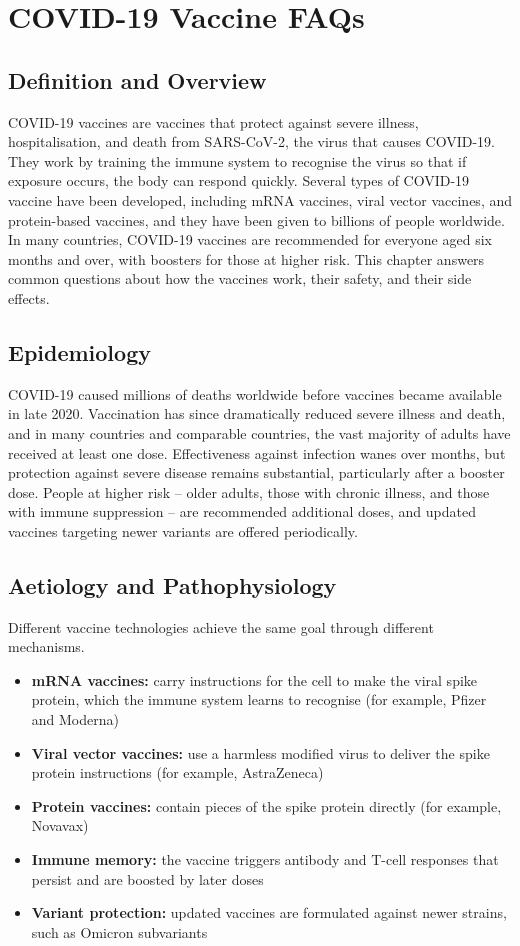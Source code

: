 \chapter{COVID-19 Vaccine FAQs}

\section*{Definition and Overview}
COVID-19 vaccines are vaccines that protect against severe illness, hospitalisation, and death from SARS-CoV-2, the virus that causes COVID-19. They work by training the immune system to recognise the virus so that if exposure occurs, the body can respond quickly. Several types of COVID-19 vaccine have been developed, including mRNA vaccines, viral vector vaccines, and protein-based vaccines, and they have been given to billions of people worldwide. In many countries, COVID-19 vaccines are recommended for everyone aged six months and over, with boosters for those at higher risk. This chapter answers common questions about how the vaccines work, their safety, and their side effects.

\section*{Epidemiology}
COVID-19 caused millions of deaths worldwide before vaccines became available in late 2020. Vaccination has since dramatically reduced severe illness and death, and in many countries and comparable countries, the vast majority of adults have received at least one dose. Effectiveness against infection wanes over months, but protection against severe disease remains substantial, particularly after a booster dose. People at higher risk -- older adults, those with chronic illness, and those with immune suppression -- are recommended additional doses, and updated vaccines targeting newer variants are offered periodically.

\section*{Aetiology and Pathophysiology}
Different vaccine technologies achieve the same goal through different mechanisms.

\begin{itemize}
    \item \textbf{mRNA vaccines:} carry instructions for the cell to make the viral spike protein, which the immune system learns to recognise (for example, Pfizer and Moderna)
    \item \textbf{Viral vector vaccines:} use a harmless modified virus to deliver the spike protein instructions (for example, AstraZeneca)
    \item \textbf{Protein vaccines:} contain pieces of the spike protein directly (for example, Novavax)
    \item \textbf{Immune memory:} the vaccine triggers antibody and T-cell responses that persist and are boosted by later doses
    \item \textbf{Variant protection:} updated vaccines are formulated against newer strains, such as Omicron subvariants
\end{itemize}

